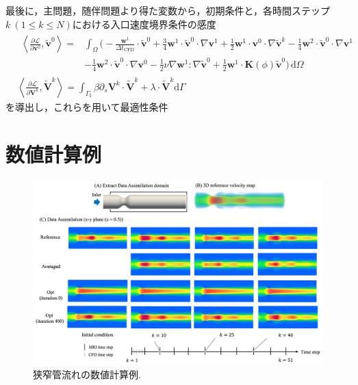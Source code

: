 \documentclass[a4paper,xelatex,ja=standard]{bxjsarticle}
\begin{document}
最後に，主問題，随伴問題より得た変数から，初期条件と，各時間ステップ$k \ (1 \leq k \leq N)$における入口速度境界条件の感度
\begin{align}
    \label{eq:adjoint_v0}
    &\begin{aligned}
        \left\langle\frac{\partial \mathcal{L}}{\partial \mathbf{v}^0}, \tilde{\mathbf{v}}^0\right\rangle
        = &\int_{\Omega} \bigg(- \frac{ \mathbf{w}^{1}}{\Delta t_{\text{CFD}}} \cdot \tilde{\mathbf{v}}^0
        + \frac{3}{4} \mathbf{w}^{1} \cdot \tilde{\mathbf{v}}^0 \cdot \nabla \mathbf{v}^{1}
        + \frac{1}{2} \mathbf{w}^{1} \cdot \mathbf{v}^0 \cdot \nabla \tilde{\mathbf{v}}^{k} 
        - \frac{1}{4} \mathbf{w}^{2} \cdot \tilde{\mathbf{v}}^{0} \cdot \nabla \mathbf{v}^1 \\
        &- \frac{1}{4} \mathbf{w}^{2} \cdot \tilde{\mathbf{v}}^{0} \cdot \nabla \mathbf{v}^{0}
         - \frac{1}{2} \nu \nabla \mathbf{w}^{1} : \nabla \tilde{\mathbf{v}}^0
        + \frac{1}{2} \mathbf{w}^{1} \cdot \mathbf{K}(\phi) \tilde{\mathbf{v}}^0 
        \bigg) \, \mathrm{d}\Omega 
    \end{aligned} \\
    &\left\langle\frac{\partial \mathcal{L}}{\partial \mathbf{V}^k}, \widetilde{\mathbf{V}}^k\right\rangle
    =\int_{\Gamma_{\mathrm{I}}} \beta \partial_s \mathbf{V}^k \cdot \widetilde{\mathbf{V}}^k+\lambda \cdot \widetilde{\mathbf{V}}^k \mathrm{d} \Gamma
\end{align}
を導出し，これらを用いて最適性条件

\newpage
\section{数値計算例}

\begin{figure}
    \begin{center}
      \includegraphics[scale=0.5]{figures/results_all.png} 
    \end{center}
    \caption{狭窄管流れの数値計算例.}
    \label{fig:2}    
\end{figure}
\end{document}
